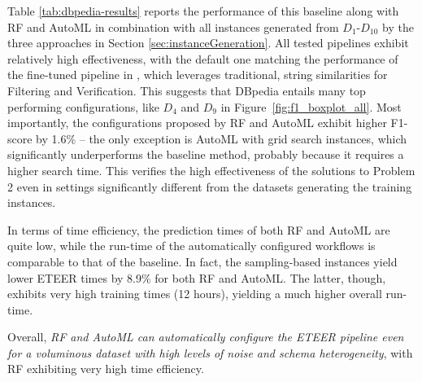 Table \ref{tab:dbpedia-results} reports the performance of this baseline
along with 
RF and AutoML in combination with all instances generated from $D_1$-$D_{10}$ by the three approaches in Section \ref{sec:instanceGeneration}. 
All tested pipelines exhibit relatively high effectiveness, with the default one matching the performance of the fine-tuned pipeline in \cite{DBLP:journals/is/PapadakisMGSTGB20}, which leverages traditional, string similarities for Filtering and Verification. This suggests that DBpedia entails many top performing configurations, like $D_4$ and $D_9$ in Figure~\ref{fig:f1_boxplot_all}. Most importantly, the configurations proposed by RF and AutoML exhibit higher F1-score by 1.6\% -- the only exception is AutoML with grid search instances, which significantly underperforms the baseline method, probably because it  requires a higher search time. This verifies the high effectiveness of the solutions to Problem 2 even in settings significantly different from the datasets generating the training instances. 

In terms of time efficiency, the prediction times of both RF and AutoML are quite low, while the run-time of the automatically configured workflows is comparable to that of the baseline.
In fact, the sampling-based instances yield lower ETEER times by 8.9\% for both RF and AutoML. The latter, though, exhibits very high training times (12 hours), yielding a much higher overall run-time.

Overall, \textit{RF and AutoML 
can automatically configure 
the ETEER pipeline even for a voluminous dataset with high levels of noise and schema heterogeneity}, with RF exhibiting very high time efficiency.

